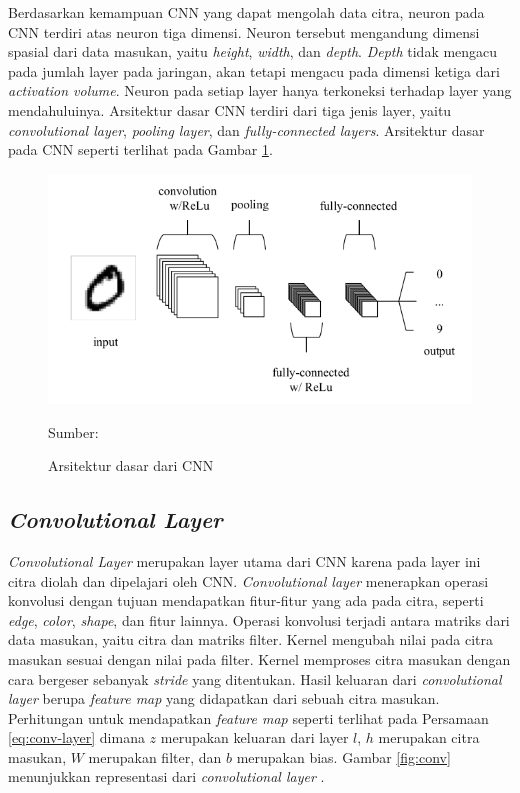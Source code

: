 Berdasarkan kemampuan CNN yang dapat mengolah data citra, neuron pada CNN terdiri atas neuron tiga dimensi. Neuron tersebut mengandung dimensi spasial dari data masukan, yaitu \textit{height}, \textit{width}, dan \textit{depth}. \textit{Depth} tidak mengacu pada jumlah layer pada jaringan, akan tetapi mengacu pada dimensi ketiga dari \textit{activation volume}. Neuron pada setiap layer hanya terkoneksi terhadap layer yang mendahuluinya. Arsitektur dasar CNN terdiri dari tiga jenis layer, yaitu \textit{convolutional layer}, \textit{pooling layer}, dan \textit{fully-connected layers}. Arsitektur dasar pada CNN seperti terlihat pada Gambar \ref{fig:cnn}.

\begin{figure}[H]
    \begin{center}
        \includegraphics[width=12cm]{img/bab2/cnn.png}
        \caption{Arsitektur dasar dari CNN}
        \label{fig:cnn}
        Sumber: \citep{OShea2015}
    \end{center}
\end{figure}

    \subsection{\textit{Convolutional Layer}}
    \textit{Convolutional Layer} merupakan layer utama dari CNN karena pada layer ini citra diolah dan dipelajari oleh CNN. \textit{Convolutional layer} menerapkan operasi konvolusi dengan tujuan mendapatkan fitur-fitur yang ada pada citra, seperti \textit{edge}, \textit{color}, \textit{shape}, dan fitur lainnya. Operasi konvolusi terjadi antara matriks dari data masukan, yaitu citra dan matriks filter. Kernel mengubah nilai pada citra masukan sesuai dengan nilai pada filter. Kernel memproses citra masukan dengan cara bergeser sebanyak \textit{stride} yang ditentukan. Hasil keluaran dari \textit{convolutional layer} berupa \textit{feature map} yang didapatkan dari sebuah citra masukan. Perhitungan untuk mendapatkan \textit{feature map} seperti terlihat pada Persamaan \ref{eq:conv-layer} dimana $z$ merupakan keluaran dari layer $l$, $h$ merupakan citra masukan, $W$ merupakan filter, dan $b$ merupakan bias. Gambar \ref{fig:conv} menunjukkan representasi dari \textit{convolutional layer} \citep{OShea2015}.

